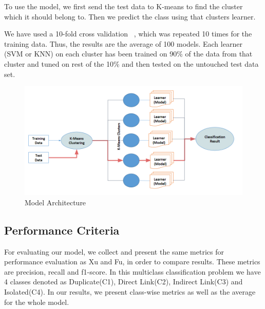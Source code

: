 \documentclass[sigconf]{acmart}
\theoremstyle{break}
\begin{document}
    To use the model, we first send the test data to K-means to find the cluster which it should belong to. Then we predict the class using that cluster\textquotesingle s learner.
    
    We have used a 10-fold cross validation ~\cite{kohavi1995study}, which was repeated 10 times for the training data. Thus, the results are the average of 100 models. Each learner (SVM or KNN) on each cluster has been trained on 90\% of the data from that cluster and tuned on rest of the 10\% and then tested on the untouched test data set. 
    
    \begin{figure}
        \centering
        \includegraphics[width=\linewidth]{fig/Models.png}
        \caption{Model Architecture}
        \label{fig:our_model}
    \end{figure}
    
    \subsection{Performance Criteria}
    \label{sssec:performance_criteria}
    For evaluating our model, we collect and present the same metrics for performance evaluation as Xu and Fu, in order to compare results. These metrics are precision, recall and f1-score. In this multiclass classification problem we have 4 classes denoted as Duplicate(C1), Direct Link(C2), Indirect Link(C3) and Isolated(C4). In our results, we present class-wise metrics as well as the average for the whole model.
    
\end{document}

